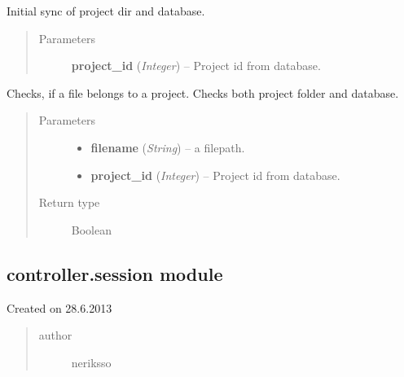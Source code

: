 \documentclass[letterpaper,10pt,english]{sphinxmanual}
\begin{document}

\begin{fulllineitems}
\label{controller:controller.project.init_sync_project_directory}
Initial sync of project dir and database.
\begin{quote}\begin{description}
\item[{Parameters}] \leavevmode
\textbf{project\_id} (\emph{Integer}) -- Project id from database.

\end{description}\end{quote}

\end{fulllineitems}


\begin{fulllineitems}
\label{controller:controller.project.is_project_file}
Checks, if a file belongs to a project. Checks both project folder
and database.
\begin{quote}\begin{description}
\item[{Parameters}] \leavevmode\begin{itemize}
\item {} 
\textbf{filename} (\emph{String}) -- a filepath.

\item {} 
\textbf{project\_id} (\emph{Integer}) -- Project id from database.

\end{itemize}

\item[{Return type}] \leavevmode
Boolean

\end{description}\end{quote}

\end{fulllineitems}



\subsection{controller.session module}
\label{controller:module-controller.session}\label{controller:controller-session-module}
Created on 28.6.2013
\begin{quote}\begin{description}
\item[{author}] \leavevmode
neriksso

\end{description}\end{quote}
\end{document}
